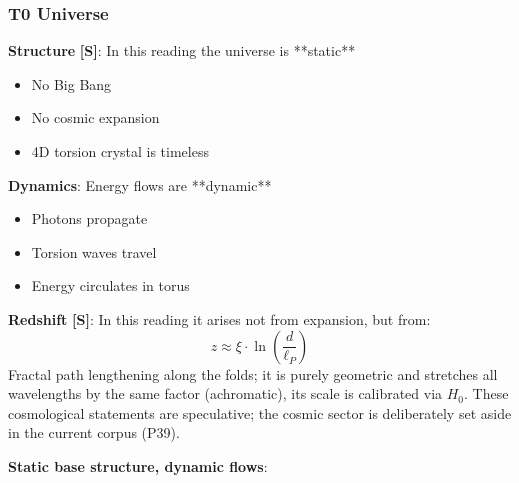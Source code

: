 	\subsubsection{T0 Universe}

	\textbf{Structure} \textbf{[S]}: In this reading the universe is **static**
	\begin{itemize}
		\item No Big Bang
		\item No cosmic expansion
		\item 4D torsion crystal is timeless
	\end{itemize}

	\textbf{Dynamics}: Energy flows are **dynamic**
	\begin{itemize}
		\item Photons propagate
		\item Torsion waves travel
		\item Energy circulates in torus
	\end{itemize}

	\textbf{Redshift} \textbf{[S]}: In this reading it arises not from expansion, but from:
	\begin{equation}
		z \approx \xi \cdot \ln\left(\frac{d}{\ell_P}\right)
	\end{equation}
	Fractal path lengthening along the folds; it is purely geometric and stretches all wavelengths by the same factor (achromatic), its scale is calibrated via $H_0$. These cosmological statements are speculative; the cosmic sector is deliberately set aside in the current corpus (P39).

	\begin{keyresult}
		\textbf{Static base structure, dynamic flows}:

		\vspace{0.3cm}

		\begin{center}
		\end{center}
	\end{keyresult}

